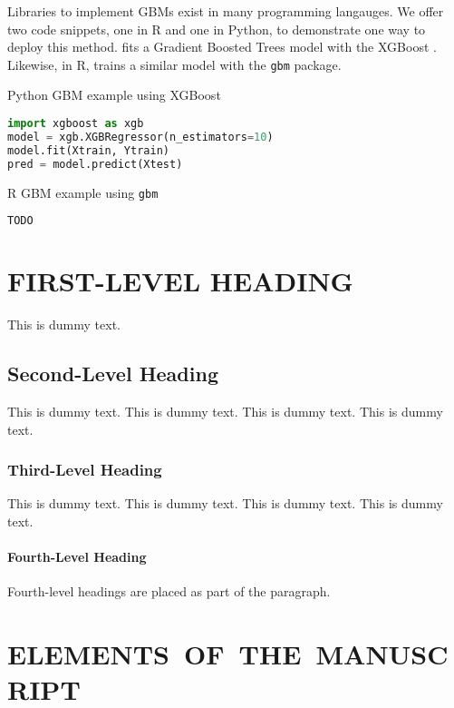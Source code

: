 \documentclass{ar-1col-S2O}
\newcounter{snippet}
\begin{document}
Libraries to implement GBMs exist in many programming langauges.  We offer two code snippets, one in R and one in Python, to demonstrate one way to deploy this method.   fits a Gradient Boosted Trees model with the XGBoost \cite{chen2016xgboost}.  Likewise, in R,  trains a similar model with the \texttt{gbm} package.

\begin{algorithm}
\caption{Python GBM example using XGBoost}\label{alg:xgboost}
\begin{lstlisting}[language=Python]
import xgboost as xgb
model = xgb.XGBRegressor(n_estimators=10)
model.fit(Xtrain, Ytrain)
pred = model.predict(Xtest)
\end{lstlisting}
\end{algorithm}

\begin{algorithm}
    \caption{R GBM example using \texttt{gbm}}\label{alg:xgboost}
\begin{lstlisting}[language=Python]
TODO
\end{lstlisting}
\end{algorithm}


\section{FIRST-LEVEL HEADING}
This is dummy text. 
\subsection{Second-Level Heading}
This is dummy text. This is dummy text. This is dummy text. This is dummy text.

\subsubsection{Third-Level Heading}
This is dummy text. This is dummy text. This is dummy text. This is dummy text. 

\paragraph{Fourth-Level Heading} Fourth-level headings are placed as part of the paragraph.

\section{ELEMENTS\ OF\ THE\ MANUSCRIPT} 
\end{document}
